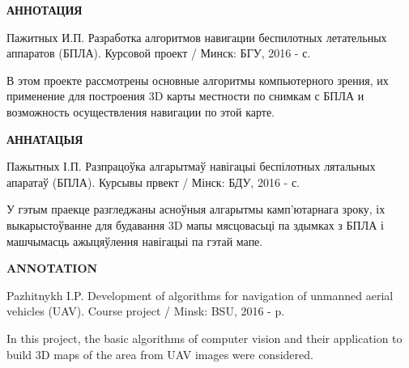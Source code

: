 \begin{center}
     \Large\bfseries{АННОТАЦИЯ}
\end{center}

Пажитных И.П. Разработка алгоритмов навигации беспилотных летательных аппаратов (БПЛА). Курсовой проект / Минск: БГУ, 2016 - \pageref{LastPage} с.

В этом проекте рассмотрены основные алгоритмы компьютерного зрения, их применение для построения 3D карты местности по снимкам с БПЛА и возможность осуществления навигации по этой карте.

\begin{center}
     \Large\bfseries{АННАТАЦЫЯ}
\end{center}

Пажытных І.П. Разпрацоўка алгарытмаў навігацыі беспілотных лятальных апаратаў (БПЛА). Курсывы првект / Мінск: БДУ, 2016 - \pageref{LastPage} с.

У гэтым праекце разгледжаны асноўныя алгарытмы камп'ютарнага зроку, іх выкарыстоўванне для будавання 3D мапы мясцовасьці па здымках з БПЛА і машчымасць ажыцяўлення навігацыі па гэтай мапе.

\begin{center}
     \Large\bfseries{ANNOTATION}
\end{center}

Pazhitnykh I.P. Development of algorithms for navigation of unmanned aerial vehicles (UAV). Course project / Minsk: BSU, 2016 - \pageref{LastPage} p.

In this project, the basic algorithms of computer vision and their application to build 3D maps of the area from UAV images were considered. 

\newpage